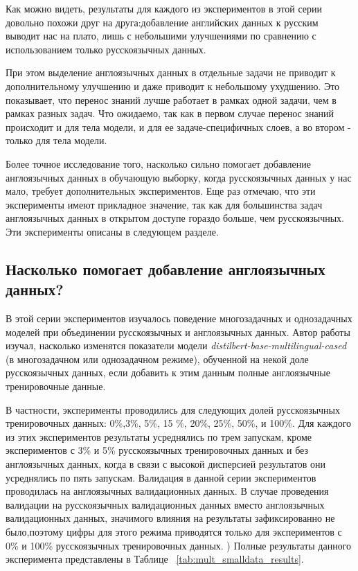 Как можно видеть, результаты для каждого из экспериментов в этой серии довольно похожи друг на друга:добавление английских данных к русским выводит нас на плато, лишь с небольшими улучшениями по сравнению с использованием только русскоязычных данных.  

При этом выделение англоязычных данных в отдельные задачи не приводит к дополнительному улучшению и даже приводит к небольшому ухудшению. Это показывает, что перенос знаний лучше работает в рамках одной задачи, чем в рамках разных задач. Что ожидаемо, так как в первом случае перенос знаний происходит и для тела модели, и для ее задаче-специфичных слоев, а во втором - только для тела модели. 

Более точное исследование того, насколько сильно помогает добавление англоязычных данных в обучающую выборку, когда русскоязычных данных у нас мало, требует дополнительных экспериментов. Еще раз отмечаю, что эти эксперименты имеют прикладное значение, так как для большинства задач англоязычных данных в открытом доступе гораздо больше, чем русскоязычных. Эти эксперименты описаны в следующем разделе.

\subsection{Насколько помогает добавление англоязычных данных? }

В этой серии экспериментов изучалось поведение многозадачных и однозадачных моделей при объединении русскоязычных и англоязычных данных.  Автор работы изучал, насколько изменятся показатели модели \textit{distilbert-base-multilingual-cased} (в многозадачном или однозадачном режиме), обученной на некой доле русскоязычных данных, если добавить к этим данным полные англоязычные тренировочные данные.

В частности, эксперименты проводились для следующих долей русскоязычных тренировочных данных: 0\%,3\%, 5\%, 15 \%, 20\%, 25\%, 50\%, и 100\%. Для каждого из этих экспериментов результаты усреднялись по трем запускам, кроме экспериментов с 3\% и 5\% русскоязычных тренировочных данных и без англоязычных данных, когда в связи с высокой дисперсией результатов они усреднялись по пять запускам. 
Валидация в данной серии экспериментов проводилась на англоязычных валидационных данных. В случае проведения валидации на русскоязычных валидационных данных вместо англоязычных валидационных данных, значимого влияния на результаты зафиксированно не было,поэтому цифры для этого режима приводятся только для экспериментов с 0\% и 100\% русскоязычных тренировочных данных. ) 
 Полные результаты данного эксперимента представлены в Таблице ~\ref{tab:mult_smalldata_results}. 

